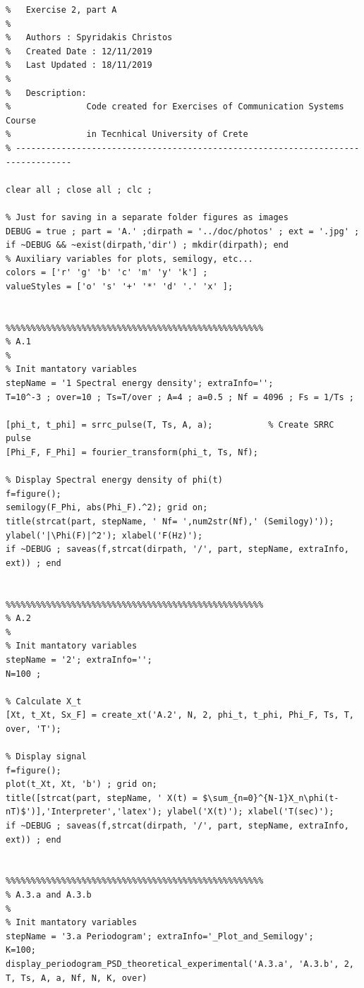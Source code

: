 \documentclass[11pt]{article}
\begin{document}
\begin{lstlisting}[caption = {\texttt{part\_a.m}}]
% ---------------------------------------------------------------------------------
%   Exercise 2, part A
%
%   Authors : Spyridakis Christos
%   Created Date : 12/11/2019
%   Last Updated : 18/11/2019
%
%   Description: 
%               Code created for Exercises of Communication Systems Course
%               in Tecnhical University of Crete
% ---------------------------------------------------------------------------------

clear all ; close all ; clc ;

% Just for saving in a separate folder figures as images
DEBUG = true ; part = 'A.' ;dirpath = '../doc/photos' ; ext = '.jpg' ; if ~DEBUG && ~exist(dirpath,'dir') ; mkdir(dirpath); end
% Auxiliary variables for plots, semilogy, etc...
colors = ['r' 'g' 'b' 'c' 'm' 'y' 'k'] ;
valueStyles = ['o' 's' '+' '*' 'd' '.' 'x' ];


%%%%%%%%%%%%%%%%%%%%%%%%%%%%%%%%%%%%%%%%%%%%%%%%%%%
% A.1
%
% Init mantatory variables
stepName = '1 Spectral energy density'; extraInfo='';
T=10^-3 ; over=10 ; Ts=T/over ; A=4 ; a=0.5 ; Nf = 4096 ; Fs = 1/Ts ; 

[phi_t, t_phi] = srrc_pulse(T, Ts, A, a);           % Create SRRC pulse  
[Phi_F, F_Phi] = fourier_transform(phi_t, Ts, Nf);

% Display Spectral energy density of phi(t)
f=figure();
semilogy(F_Phi, abs(Phi_F).^2); grid on;       
title(strcat(part, stepName, ' Nf= ',num2str(Nf),' (Semilogy)')); ylabel('|\Phi(F)|^2'); xlabel('F(Hz)');
if ~DEBUG ; saveas(f,strcat(dirpath, '/', part, stepName, extraInfo, ext)) ; end


%%%%%%%%%%%%%%%%%%%%%%%%%%%%%%%%%%%%%%%%%%%%%%%%%%%
% A.2
%
% Init mantatory variables
stepName = '2'; extraInfo='';
N=100 ; 
    
% Calculate X_t
[Xt, t_Xt, Sx_F] = create_xt('A.2', N, 2, phi_t, t_phi, Phi_F, Ts, T, over, 'T');  
    
% Display signal
f=figure();
plot(t_Xt, Xt, 'b') ; grid on;
title([strcat(part, stepName, ' X(t) = $\sum_{n=0}^{N-1}X_n\phi(t-nT)$')],'Interpreter','latex'); ylabel('X(t)'); xlabel('T(sec)');  
if ~DEBUG ; saveas(f,strcat(dirpath, '/', part, stepName, extraInfo, ext)) ; end 


%%%%%%%%%%%%%%%%%%%%%%%%%%%%%%%%%%%%%%%%%%%%%%%%%%%
% A.3.a and A.3.b
%
% Init mantatory variables
stepName = '3.a Periodogram'; extraInfo='_Plot_and_Semilogy';
K=100;
display_periodogram_PSD_theoretical_experimental('A.3.a', 'A.3.b', 2, T, Ts, A, a, Nf, N, K, over)


\end{lstlisting}
\end{document}
